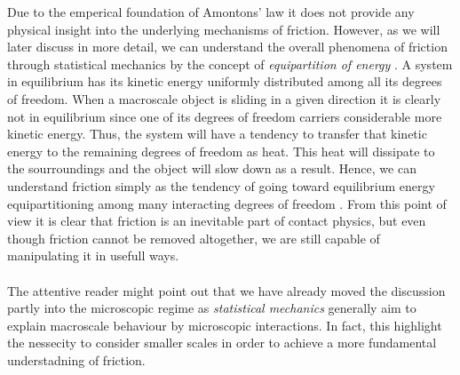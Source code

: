 Due to the emperical foundation of Amontons’ law it does not provide
any physical insight into the underlying mechanisms of friction. However, as we
will later discuss in more detail, we can understand the overall phenomena of
friction through statistical mechanics by the concept of \textit{equipartition
of energy} \cite{Manini_2016}. A system in equilibrium has its kinetic energy
uniformly distributed among all its degrees of freedom. When a macroscale object
is sliding in a given direction it is clearly not in equilibrium since one of
its degrees of freedom carriers considerable more kinetic energy. Thus, the
system will have a tendency to transfer that kinetic energy to the remaining
degrees of freedom as heat. This heat will dissipate to the sourroundings and
the object will slow down as a result. Hence, we can understand friction simply as the tendency of going toward equilibrium energy equipartitioning among many
interacting degrees of freedom \cite{Manini_2016}. From this point of view it is
clear that friction is an inevitable part of contact physics, but even though
friction cannot be removed altogether, we are still capable of manipulating it in
usefull ways. \\
\\
The attentive reader might point out that we have already moved the discussion
partly into the microscopic regime as \textit{statistical mechanics} generally
aim to explain macroscale behaviour by microscopic interactions. In fact, this 
highlight the nessecity to consider smaller scales in order to achieve a more fundamental understadning of friction.









